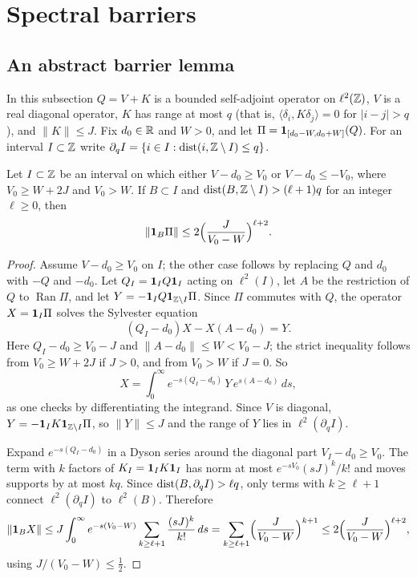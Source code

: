 \section{Spectral barriers}\label{sec:barriers}

\subsection{An abstract barrier lemma}

In this subsection $Q=V+K$ is a bounded self-adjoint operator on $\ell^2(\mathbb Z)$, $V$ is a real diagonal operator, $K$ has range at most $q$ (that is, $\langle\delta_i,K\delta_j\rangle=0$ for $|i-j|>q$), and $\|K\|\le J$. Fix $d_0\in\mathbb R$ and $W>0$, and let $\Pi=\mathbf 1_{[d_0-W,d_0+W]}(Q)$. For an interval $I\subset\mathbb Z$ write $\partial_qI=\{i\in I:\operatorname{dist}(i,\mathbb Z\setminus I)\le q\}$.

\begin{lemma}\label{lem:outer}
Let $I\subset\mathbb Z$ be an interval on which either $V-d_0\ge V_0$ or $V-d_0\le-V_0$, where $V_0\ge W+2J$ and $V_0>W$. If $B\subset I$ and $\operatorname{dist}(B,\mathbb Z\setminus I)>(\ell+1)q$ for an integer $\ell\ge0$, then
\[
\|\mathbf 1_B\Pi\|\le2\Bigl(\frac{J}{V_0-W}\Bigr)^{\ell+2}.
\]
\end{lemma}

\begin{proof}
Assume $V-d_0\ge V_0$ on $I$; the other case follows by replacing $Q$ and $d_0$ with $-Q$ and $-d_0$. Let $Q_I=\mathbf 1_IQ\mathbf 1_I$ acting on $\ell^2(I)$, let $A$ be the restriction of $Q$ to $\operatorname{Ran}\Pi$, and let $Y=-\mathbf 1_IQ\mathbf 1_{\mathbb Z\setminus I}\Pi$. Since $\Pi$ commutes with $Q$, the operator $X=\mathbf 1_I\Pi$ solves the Sylvester equation
\[
(Q_I-d_0)X-X(A-d_0)=Y.
\]
Here $Q_I-d_0\ge V_0-J$ and $\|A-d_0\|\le W<V_0-J$; the strict inequality follows from $V_0\ge W+2J$ if $J>0$, and from $V_0>W$ if $J=0$. So
\[
X=\int_0^\infty e^{-s(Q_I-d_0)}\,Y\,e^{s(A-d_0)}\,ds,
\]
as one checks by differentiating the integrand. Since $V$ is diagonal, $Y=-\mathbf 1_IK\mathbf 1_{\mathbb Z\setminus I}\Pi$, so $\|Y\|\le J$ and the range of $Y$ lies in $\ell^2(\partial_qI)$.

Expand $e^{-s(Q_I-d_0)}$ in a Dyson series around the diagonal part $V_I-d_0\ge V_0$. The term with $k$ factors of $K_I=\mathbf 1_IK\mathbf 1_I$ has norm at most $e^{-sV_0}(sJ)^k/k!$ and moves supports by at most $kq$. Since $\operatorname{dist}(B,\partial_qI)>\ell q$, only terms with $k\ge\ell+1$ connect $\ell^2(\partial_qI)$ to $\ell^2(B)$. Therefore
\[
\|\mathbf 1_BX\|\le J\int_0^\infty e^{-s(V_0-W)}\sum_{k\ge\ell+1}\frac{(sJ)^k}{k!}\,ds=\sum_{k\ge\ell+1}\Bigl(\frac{J}{V_0-W}\Bigr)^{k+1}\le2\Bigl(\frac{J}{V_0-W}\Bigr)^{\ell+2},
\]
using $J/(V_0-W)\le\frac12$.
\end{proof}

